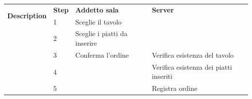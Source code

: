 \begin{table}[H]
\begin{tabularx}{\linewidth}{|l|X|X|X|}
    \hline \multirow{2}{*}{\textbf{Description}}
                                           & \textbf{Step}                                                                     & \textbf{Addetto sala}        & \textbf{Server}                        \\
    \cline{2-4}                            & 1                                                                                 & Sceglie il tavolo            &                                        \\
    \cline{2-4}                            & 2                                                                                 & Sceglie i piatti da inserire &                                        \\
    \cline{2-4}                            & 3                                                                                 & Conferma l'ordine            & Verifica esistenza del tavolo          \\
    \cline{2-4}                            & 4                                                                                 &                              & Verifica esistenza dei piatti inseriti \\

    \cline{2-4}                            & 5                                                                                 &                              & Registra ordine                        \\
    \hline
  \end{tabularx}
\end{table}
